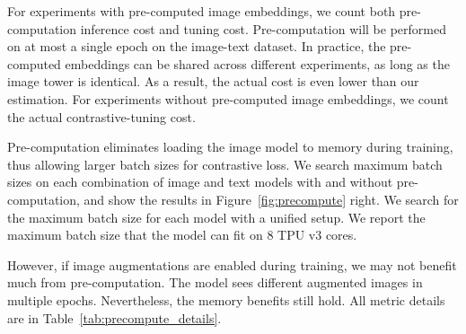 \documentclass[10pt,twocolumn,letterpaper]{article}
\begin{document}
For experiments with pre-computed image embeddings, we count both pre-computation inference cost and tuning cost. 
Pre-computation will be performed on at most a single epoch on the image-text dataset.
In practice, the pre-computed embeddings can be shared across different experiments, as long as the image tower is identical. 
As a result, the actual cost is even lower than our estimation.
For experiments without pre-computed image embeddings, we count the actual contrastive-tuning cost.

Pre-computation eliminates loading the image model to memory during training, thus allowing larger batch sizes for contrastive loss. 
We search maximum batch sizes on each combination of image and text models with and without pre-computation, and show the results in Figure~\ref{fig:precompute} right. We search for the maximum batch size for each model with a unified setup. We report the maximum batch size that the model can fit on 8 TPU v3 cores.

However, if image augmentations are enabled during training, we may not benefit much from pre-computation.
The model sees different augmented images in multiple epochs.
Nevertheless, the memory benefits still hold.
All metric details are in Table~\ref{tab:precompute_details}.
\end{document}

